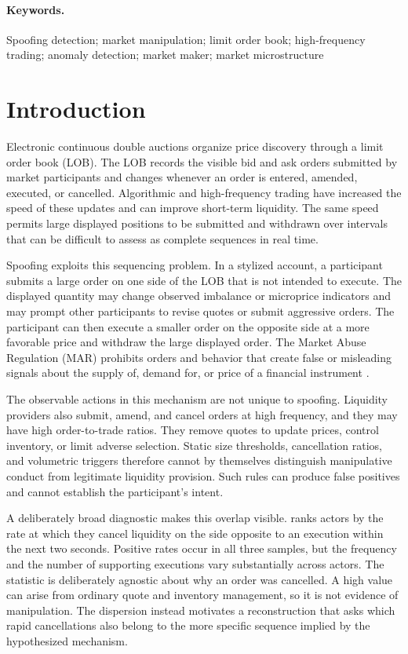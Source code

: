 \documentclass[11pt]{article}
\newenvironment{review}{\begingroup\color{blue}}{\endgroup}
\begin{document}
\paragraph{Keywords.}
Spoofing detection; market manipulation; limit order book; high-frequency trading; anomaly detection; market maker; market microstructure

\section{Introduction}
\label{sec:introduction}
Electronic continuous double auctions organize price discovery through a limit order book (LOB). The LOB records the
visible bid and ask orders submitted by market participants and changes whenever an order is entered, amended, executed,
or cancelled. Algorithmic and high-frequency trading have increased the speed of these updates and can improve short-term
liquidity. The same speed permits large displayed positions to be submitted and withdrawn over intervals that can be
difficult to assess as complete sequences in real time.

Spoofing exploits this sequencing problem. In a stylized account, a participant submits a large order on one side of the
LOB that is not intended to execute. The displayed quantity may change observed imbalance or microprice indicators and may
prompt other participants to revise quotes or submit aggressive orders. The participant can then execute a smaller order on
the opposite side at a more favorable price and withdraw the large displayed order. The Market Abuse Regulation (MAR)
prohibits orders and behavior that create false or misleading signals about the supply of, demand for, or price of a
financial instrument \cite{EU5962014}.

The observable actions in this mechanism are not unique to spoofing. Liquidity providers also submit, amend, and cancel
orders at high frequency, and they may have high order-to-trade ratios. They remove quotes to update prices,
control inventory, or limit adverse selection. Static size thresholds, cancellation ratios, and volumetric triggers
therefore cannot by themselves distinguish manipulative conduct from legitimate liquidity provision. Such rules can
produce false positives and cannot establish the participant's intent.

\begin{review}
A deliberately broad diagnostic makes this overlap visible.  ranks actors by the rate at
which they cancel liquidity on the side opposite to an execution within the next two seconds. Positive rates occur in all
three samples, but the frequency and the number of supporting executions vary substantially across actors. The
statistic is deliberately agnostic about why an order was cancelled. A high value can arise from ordinary quote and
inventory management, so it is not evidence of manipulation. The dispersion instead motivates a reconstruction that asks
which rapid cancellations also belong to the more specific sequence implied by the hypothesized mechanism.
\end{review}
\end{document}
